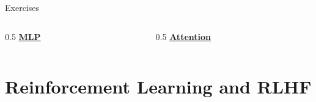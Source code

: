 \documentclass[aspectratio=169]{beamer}
\begin{document}
\begin{frame}{Exercises}
\begin{columns}[c]
\begin{column}{0.5\textwidth}
\centering
\Large \href{https://colab.research.google.com/github/wusche1/Illiad_ML_Engineering/blob/main/lectures/01_a_ml_foundations/exercises/04_mlp/notebook.ipynb}{\textbf{MLP}} \\[1em]
\end{column}
\begin{column}{0.5\textwidth}
\centering
\Large \href{https://colab.research.google.com/github/wusche1/Illiad_ML_Engineering/blob/main/lectures/01_a_ml_foundations/exercises/05_attention/notebook.ipynb}{\textbf{Attention}} \\[1em]
\end{column}
\end{columns}
\end{frame}

\section{Reinforcement Learning and RLHF}
\end{document}
